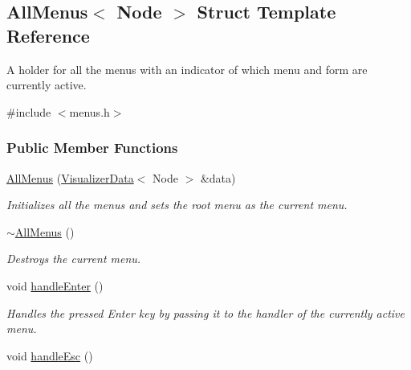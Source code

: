 \hypertarget{structAllMenus}{}\subsection{All\+Menus$<$ Node $>$ Struct Template Reference}
\label{structAllMenus}


A holder for all the menus with an indicator of which menu and form are currently active.  




{\ttfamily \#include $<$menus.\+h$>$}

\subsubsection*{Public Member Functions}
\begin{DoxyCompactItemize}
\item 
\hyperlink{structAllMenus_a527325d893a588fd01389fb752955278}{All\+Menus} (\hyperlink{structVisualizerData}{Visualizer\+Data}$<$ Node $>$ \&data)
\begin{DoxyCompactList}\small\item\em Initializes all the menus and sets the root menu as the current menu. \end{DoxyCompactList}\item 
\hyperlink{structAllMenus_ae635f658d90c70ff7dcf874e7e02b402}{$\sim$\+All\+Menus} ()\hypertarget{structAllMenus_ae635f658d90c70ff7dcf874e7e02b402}{}\label{structAllMenus_ae635f658d90c70ff7dcf874e7e02b402}

\begin{DoxyCompactList}\small\item\em Destroys the current menu. \end{DoxyCompactList}\item 
void \hyperlink{structAllMenus_afad1364659427dc3da6bd7c6ed7fa193}{handle\+Enter} ()\hypertarget{structAllMenus_afad1364659427dc3da6bd7c6ed7fa193}{}\label{structAllMenus_afad1364659427dc3da6bd7c6ed7fa193}

\begin{DoxyCompactList}\small\item\em Handles the pressed Enter key by passing it to the handler of the currently active menu. \end{DoxyCompactList}\item 
void \hyperlink{structAllMenus_a4a7e37ec19e54266dda2e810d29dd145}{handle\+Esc} ()\hypertarget{structAllMenus_a4a7e37ec19e54266dda2e810d29dd145}{}\label{structAllMenus_a4a7e37ec19e54266dda2e810d29dd145}


\end{DoxyCompactItemize}
